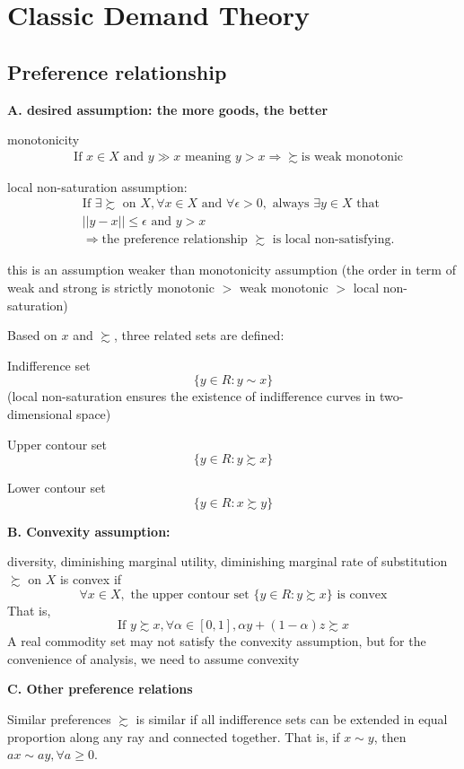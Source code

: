 \documentclass{article}
\begin{document}
\section{Classic Demand Theory}
\subsection{Preference relationship}
\textbf{A. desired assumption: the more goods, the better}

monotonicity
\begin{align}
&\text{If }x\in X \text{ and } y \gg x \text{ meaning }y>x \Rightarrow \succsim \text{is weak monotonic}
\end{align}

local non-saturation assumption:
\begin{align}
&\text{If }\exists \succsim \text{ on } X, \forall x\in X \text{ and } \forall \epsilon>0, \text{ always } \exists y \in X \text{ that}
\\&||y-x||\le \epsilon \text{ and }y>x
\\&\Rightarrow \text{the preference relationship }\succsim \text{ is local non-satisfying.}
\end{align}

this is an assumption weaker than monotonicity assumption (the order in term of weak and strong is strictly monotonic $>$ weak monotonic $>$ local non-saturation)

Based on $x$ and $\succsim$, three related sets are defined:

Indifference set
$$\{y\in R: y \sim x\}$$
(local non-saturation ensures the existence of indifference curves in two-dimensional space)

Upper contour set
$$\{y\in R: y \succsim x\}$$

Lower contour set
$$\{y\in R: x \succsim y\}$$

\textbf{B. Convexity assumption: }

diversity, diminishing marginal utility, diminishing marginal rate of substitution
$\succsim$ on $X$ is convex if
$$\forall x \in X, \text{ the upper contour set }\{y\in R: y \succsim x\} \text{ is convex} $$
That is,
$$
\text{If }y\succsim x, \forall \alpha \in [0,1],\alpha y+(1-\alpha)z \succsim x
$$
A real commodity set may not satisfy the convexity assumption, but for the convenience of analysis, we need to assume convexity

\textbf{C. Other preference relations}

Similar preferences
$\succsim$ is similar if all indifference sets can be extended in equal proportion along any ray and connected together. That is, if $x \sim y$, then $ax \sim ay, \forall a \ge 0$.
\end{document}
